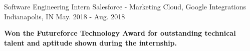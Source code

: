 \begin{cventries}
  \cventry
    {Software Engineering Intern} %
    {Salesforce - Marketing Cloud, Google Integrations} %
    {Indianapolis, IN} %
    {May. 2018 - Aug. 2018} %
    {
      \begin{cvitems} %
        \item {\textbf{Won the Futureforce Technology Award for outstanding technical talent and aptitude shown during the internship.}}
      \end{cvitems}
    }

\end{cventries}
